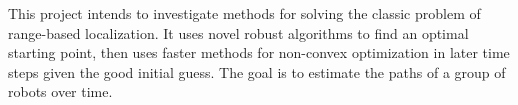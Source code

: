 This project intends to investigate methods for solving the classic problem of range-based localization. It uses novel robust algorithms to find an optimal starting point, then uses faster methods for non-convex optimization in later time steps given the good initial guess. The goal is to estimate the paths of a group of robots over time. 